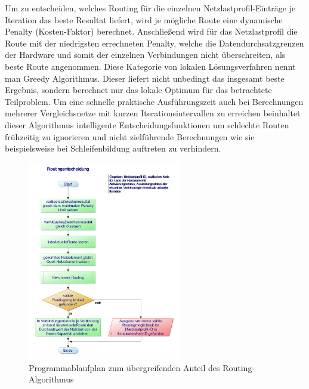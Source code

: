 \documentclass[12pt,titlepage]{article}
\begin{document}
Um zu entscheiden, welches Routing für die einzelnen Netzlastprofil-Einträge je Iteration das beste Resultat liefert, wird je mögliche Route eine dynamische Penalty (Kosten-Faktor) berechnet. Anschließend wird für das Netzlastprofil die Route mit der niedrigsten errechneten Penalty, welche die Datendurchsatzgrenzen der Hardware und somit der einzelnen Verbindungen nicht überschreiten, als beste Route angenommen. Diese Kategorie von lokalen Lösungsverfahren nennt man Greedy Algorithmus. Dieser liefert nicht unbedingt das insgesamt beste Ergebnis, sondern berechnet nur das lokale Optimum für das betrachtete Teilproblem. Um eine schnelle praktische Ausführungszeit auch bei Berechnungen mehrerer Vergleichsnetze mit kurzen Iterationsintervallen zu erreichen beinhaltet dieser Algorithmus intelligente Entscheidungsfunktionen um schlechte Routen frühzeitig zu ignorieren und nicht zielführende Berechnungen wie sie beispielsweise bei Schleifenbildung auftreten zu verhindern.
\begin{figure}[!ht]
	\centering
	\includegraphics[width=0.6\textwidth]{2Routingentscheidung}
	\caption{Programmablaufplan zum übergreifenden Anteil des Routing-Algorithmus}
	\label{fig:2Routingentscheidung}
\end{figure}
\end{document}
